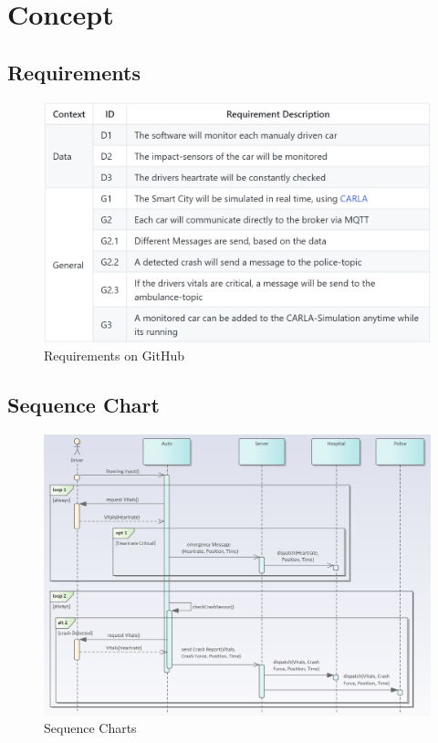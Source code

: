 \section{Concept}
\label{6sec:concept}

\subsection{Requirements}

\begin{figure}[H]
  \centering\includegraphics[width=1.0\linewidth]{chapters/chapter6_bruno/Figures/requirements.png}
  \caption{Requirements on GitHub}
  \label{fig_6:reqTable}
\end{figure}


\subsection{Sequence Chart}

\begin{figure}[H]
  \centering\includegraphics[width=1.0\linewidth]{chapters/chapter6_bruno/Figures/sequence1.png}
  \caption{Sequence Charts}
  \label{fig_6:sequenceChart1}
\end{figure}